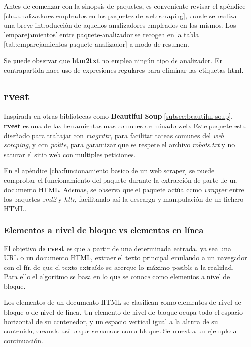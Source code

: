Antes de comenzar con la sinopsis de paquetes, es conveniente revisar el apéndice \ref{cha:analizadores 
empleados en los paquetes de web scraping}, donde se realiza una breve introducción de aquellos analizadores 
empleados en los mismos. Los ’emparejamientos’ entre paquete-analizador se recogen en la tabla 
\ref{tab:emparejamientos paquete-analizador} a modo de resumen.

Se puede observar que \textbf{htm2txt} no emplea ningún tipo de analizador. En contrapartida hace uso de 
expresiones regulares para eliminar las etiquetas html.

\subsection{rvest}
\label{subsec:rvest}

Inspirada en otras bibliotecas como \textbf{Beautiful Soup} \ref{subsec:beautiful soup}, \textbf{rvest} 
\cite{rvest-cran} es una de las herramientas mas comunes de minado web. Este paquete esta diseñado para 
trabajar con \emph{magrittr}, para facilitar tareas comunes del \emph{web scraping}, y con \emph{polite}, 
para garantizar que se respete el archivo \emph{robots.txt} y no saturar el sitio web con multiples 
peticiones.

En el apéndice \ref{cha:funcionamiento basico de un web scraper} se puede comprobar el funcionamiento del
paquete durante la extracción de parte de un documento HTML. Ademas, se observa que el paquete actúa como 
\emph{wrapper} entre los paquetes \emph{xml2} y \emph{httr}, facilitando así la descarga y manipulación 
de un fichero HTML.

\subsubsection{Elementos a nivel de bloque vs elementos en línea}
\label{subsubsec:elementos a nivel de bloque vs elementos en linea}

El objetivo de \textbf{rvest} es que a partir de una determinada entrada, ya sea una URL o un documento
HTML, extraer el texto principal emulando a un navegador con el fín de que el texto extraído se acerque 
lo máximo posible a la realidad. Para ello el algoritmo se basa en lo que se conoce como elementos a nivel 
de bloque.

Los elementos de un documento HTML se clasifican como elementos de nivel de bloque o de nivel de línea. Un 
elemento de nivel de bloque ocupa todo el espacio horizontal de su contenedor, y un espacio vertical igual 
a la altura de su contenido, creando así lo que se conoce como bloque. Se muestra un ejemplo a continuación.

